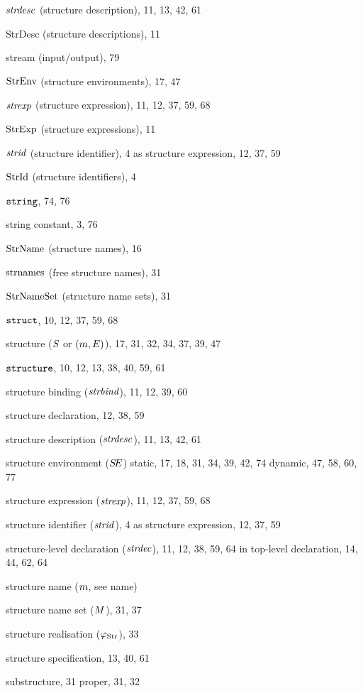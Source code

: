\begin{theindex}
\item $\strdesc$ (structure description), 11, 13, 42, 61
\item StrDesc (structure descriptions), 11
\item stream (input/output), 79
\item $\StrEnv$ (structure environments), 17, 47
\item $\strexp$ (structure expression), 11, 12, 37, 59, 68
\item $\StrExp$ (structure expressions), 11
\item $\strid$ (structure identifier), 4
\subitem as structure expression, 12, 37, 59
\item $\StrId$ (structure identifiers), 4
\item $\STRING$, 74, 76
\item string constant, 3, 76
\item $\StrNames$ (structure names), 16
\item $\StrNamesFcn$ (free structure names), 31
\item $\StrNameSets$ (structure name sets), 31
\item $\STRUCT$, 10, 12, 37, 59, 68
\item structure ($\S$ or $(\m,\E)$), 17, 31, 32, 34, 37, 39, 47
\item $\STRUCTURE$, 10, 12, 13, 38, 40, 59, 61
\item structure binding ($\strbind$), 11, 12, 39, 60
\item structure declaration, 12, 38, 59
\item structure description ($\strdesc$), 11, 13, 42, 61
\item structure environment ($\SE$) 
\subitem static, 17, 18, 31, 34, 39, 42, 74
\subitem dynamic, 47, 58, 60, 77
\item structure expression ($\strexp$), 11, 12, 37, 59, 68
\item structure identifier ($\strid$), 4
\subitem as structure expression, 12, 37, 59
\item structure-level declaration ($\strdec$), 11, 12, 38, 59, 64
\subitem in top-level declaration, 14, 44, 62, 64
\item structure name ($\m$, see name) 
\item structure name set ($\M$), 31, 37
\item structure realisation ($\strrea$), 33
\item structure specification, 13, 40, 61
\item substructure, 31
\subitem proper, 31, 32

\end{theindex}
